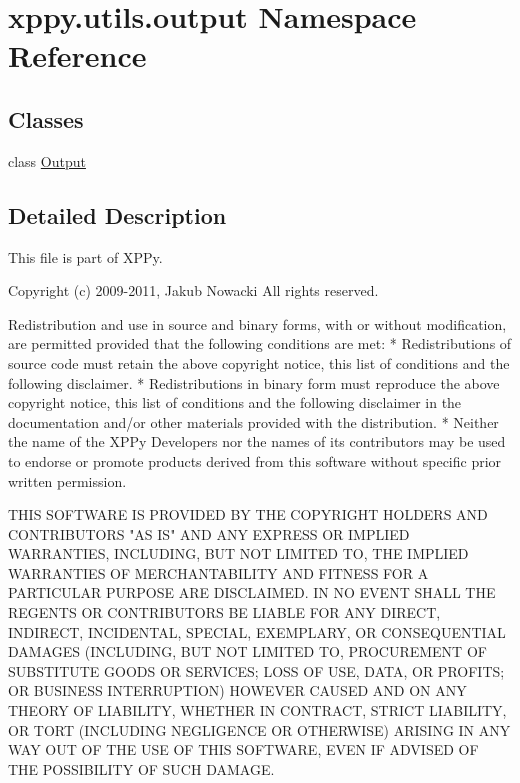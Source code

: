 \hypertarget{namespacexppy_1_1utils_1_1output}{}\section{xppy.\+utils.\+output Namespace Reference}
\label{namespacexppy_1_1utils_1_1output}
\subsection*{Classes}
\begin{DoxyCompactItemize}
\item 
class \mbox{\hyperlink{classxppy_1_1utils_1_1output_1_1_output}{Output}}
\end{DoxyCompactItemize}


\subsection{Detailed Description}
\begin{DoxyVerb}This file is part of XPPy.

Copyright (c) 2009-2011, Jakub Nowacki
All rights reserved.

Redistribution and use in source and binary forms, with or without
modification, are permitted provided that the following conditions are met:
* Redistributions of source code must retain the above copyright
  notice, this list of conditions and the following disclaimer.
* Redistributions in binary form must reproduce the above copyright
  notice, this list of conditions and the following disclaimer in the
  documentation and/or other materials provided with the distribution.
* Neither the name of the XPPy Developers nor the
  names of its contributors may be used to endorse or promote products
  derived from this software without specific prior written permission.

THIS SOFTWARE IS PROVIDED BY THE COPYRIGHT HOLDERS AND CONTRIBUTORS "AS IS" AND
ANY EXPRESS OR IMPLIED WARRANTIES, INCLUDING, BUT NOT LIMITED TO, THE IMPLIED
WARRANTIES OF MERCHANTABILITY AND FITNESS FOR A PARTICULAR PURPOSE ARE
DISCLAIMED. IN NO EVENT SHALL THE REGENTS OR CONTRIBUTORS BE LIABLE FOR ANY
DIRECT, INDIRECT, INCIDENTAL, SPECIAL, EXEMPLARY, OR CONSEQUENTIAL DAMAGES
(INCLUDING, BUT NOT LIMITED TO, PROCUREMENT OF SUBSTITUTE GOODS OR SERVICES;
LOSS OF USE, DATA, OR PROFITS; OR BUSINESS INTERRUPTION) HOWEVER CAUSED AND
ON ANY THEORY OF LIABILITY, WHETHER IN CONTRACT, STRICT LIABILITY, OR TORT
(INCLUDING NEGLIGENCE OR OTHERWISE) ARISING IN ANY WAY OUT OF THE USE OF THIS
SOFTWARE, EVEN IF ADVISED OF THE POSSIBILITY OF SUCH DAMAGE.
\end{DoxyVerb}
 